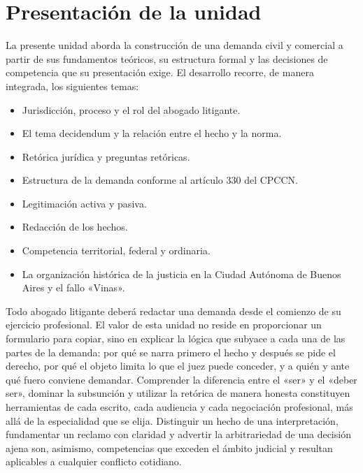 \documentclass[12pt,oneside]{book}
\begin{document}
\tableofcontents

\chapter*{Presentación de la unidad}

La presente unidad aborda la construcción de una demanda civil y comercial a partir de sus fundamentos teóricos, su estructura formal y las decisiones de competencia que su presentación exige. El desarrollo recorre, de manera integrada, los siguientes temas:

\begin{itemize}
    \item Jurisdicción, proceso y el rol del abogado litigante.
    \item El tema decidendum y la relación entre el hecho y la norma.
    \item Retórica jurídica y preguntas retóricas.
    \item Estructura de la demanda conforme al artículo 330 del CPCCN.
    \item Legitimación activa y pasiva.
    \item Redacción de los hechos.
    \item Competencia territorial, federal y ordinaria.
    \item La organización histórica de la justicia en la Ciudad Autónoma de Buenos Aires y el fallo «Vinas».
\end{itemize}

\begin{note}
Todo abogado litigante deberá redactar una demanda desde el comienzo de su ejercicio profesional. El valor de esta unidad no reside en proporcionar un formulario para copiar, sino en explicar la lógica que subyace a cada una de las partes de la demanda: por qué se narra primero el hecho y después se pide el derecho, por qué el objeto limita lo que el juez puede conceder, y a quién y ante qué fuero conviene demandar. Comprender la diferencia entre el «ser» y el «deber ser», dominar la subsunción y utilizar la retórica de manera honesta constituyen herramientas de cada escrito, cada audiencia y cada negociación profesional, más allá de la especialidad que se elija. Distinguir un hecho de una interpretación, fundamentar un reclamo con claridad y advertir la arbitrariedad de una decisión ajena son, asimismo, competencias que exceden el ámbito judicial y resultan aplicables a cualquier conflicto cotidiano.
\end{note}
\end{document}
